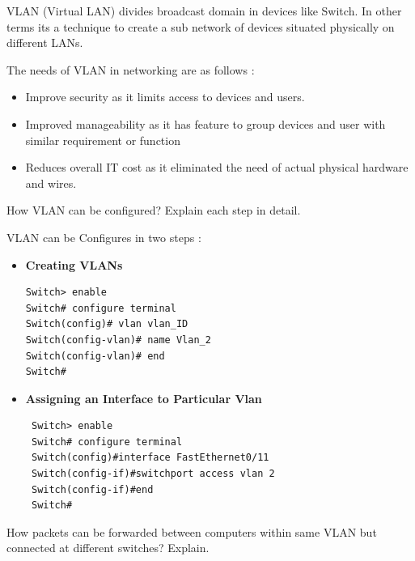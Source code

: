 \documentclass[a4paper,11pt]{article}
\begin{document}
\begin{A}
    {
        VLAN (Virtual LAN) divides broadcast domain in devices like Switch. In other terms its a technique to create a sub network of devices situated physically on different LANs.

        The needs of VLAN in networking are as follows :
        \begin{itemize}
            \item Improve security as it limits access  to devices and users.
            \item Improved manageability as it has feature to group devices and user with similar requirement or function
            \item Reduces overall IT cost as it eliminated the need of actual physical hardware and wires.
        \end{itemize}
    }
\end{A}

\begin{Q}
    {
        How VLAN can be configured? Explain each step in detail.
    }
\end{Q}


VLAN can be Configures in two steps :

\begin{itemize}
    \item \textbf{Creating VLANs}
          \begin{verbatim}
Switch> enable
Switch# configure terminal
Switch(config)# vlan vlan_ID
Switch(config-vlan)# name Vlan_2
Switch(config-vlan)# end
Switch#  \end{verbatim}
    \item  \textbf{Assigning an Interface to Particular Vlan}
          \begin{verbatim}
 Switch> enable 
 Switch# configure terminal
 Switch(config)#interface FastEthernet0/11
 Switch(config-if)#switchport access vlan 2
 Switch(config-if)#end
 Switch#  \end{verbatim}
\end{itemize}


\begin{Q}
    {
        How packets can be forwarded between computers within same VLAN but connected at
        different switches? Explain.
    }
\end{Q}
\end{document}
